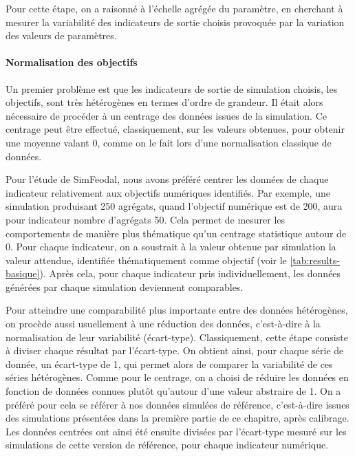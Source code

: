 Pour cette étape, on a raisonné à l'échelle agrégée du paramètre, en cherchant à mesurer la variabilité des indicateurs de sortie choisis provoquée par la variation des valeurs de paramètres.

\paragraph{Normalisation des objectifs}

Un premier problème est que les indicateurs de sortie de simulation choisis, les objectifs, sont très hétérogènes en termes d'ordre de grandeur.
Il était alors nécessaire de procéder à un \og centrage\fg{} des données issues de la simulation.
Ce centrage peut être effectué, classiquement, sur les valeurs obtenues, pour obtenir une moyenne valant 0, comme on le fait lors d'une normalisation classique de données.

Pour l'étude de SimFeodal, nous avons préféré centrer les données de chaque indicateur relativement aux objectifs numériques identifiés.
Par exemple, une simulation produisant 250 agrégats, quand l'objectif numérique est de 200, aura pour indicateur \og nombre d'agrégats\fg{} 50.
Cela permet de mesurer les comportements de manière plus thématique qu'un centrage statistique autour de 0.
Pour chaque indicateur, on a soustrait à la valeur obtenue par simulation la \og valeur attendue\fg{}, identifiée thématiquement comme objectif (voir le \cref{tab:results-basique}).
Après cela, pour chaque indicateur pris individuellement, les données générées par chaque simulation deviennent comparables.

Pour atteindre une comparabilité plus importante entre des données hétérogènes, on procède aussi usuellement à une \og réduction\fg{} des données, c'est-à-dire à la normalisation de leur variabilité (écart-type).
Classiquement, cette étape consiste à diviser chaque résultat par l'écart-type.
On obtient ainsi, pour chaque série de donnée, un écart-type de 1, qui permet alors de comparer la variabilité de ces séries hétérogènes.
Comme pour le centrage, on a choisi de réduire les données en fonction de données connues plutôt qu'autour d'une valeur abstraire de 1.
On a préféré pour cela se référer à nos données simulées de référence, c'est-à-dire issues des simulations présentées dans la première partie de ce chapitre, après calibrage.
Les données centrées ont ainsi été ensuite divisées par l'écart-type mesuré sur les simulations de cette version de référence, pour chaque indicateur numérique.


